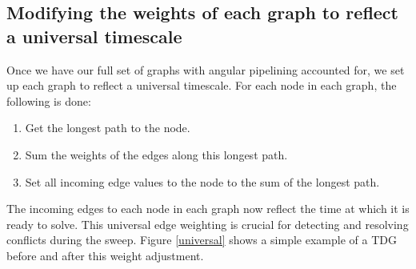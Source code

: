\subsection{Modifying the weights of each graph to reflect a universal timescale}\label{sec:universal}

Once we have our full set of graphs with angular pipelining accounted for, we set up each graph to reflect a universal timescale. For each node in each graph, the following is done:
\begin{enumerate}
  \item Get the longest path to the node.
  \item Sum the weights of the edges along this longest path.
  \item Set all incoming edge values to the node to the sum of the longest path. 
\end{enumerate}
The incoming edges to each node in each graph now reflect the time at which it is ready to solve. This universal edge weighting is crucial for detecting and resolving conflicts during the sweep. Figure \ref{universal} shows a simple example of a TDG before and after this weight adjustment.
